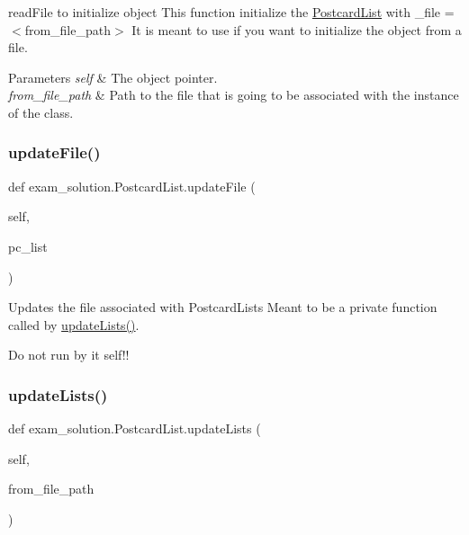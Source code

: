read\+File to initialize object This function initialize the \mbox{\hyperlink{classexam__solution_1_1PostcardList}{Postcard\+List}} with \+\_\+file = $<$from\+\_\+file\+\_\+path$>$ It is meant to use if you want to initialize the object from a file. 


\begin{DoxyParams}{Parameters}
{\em self} & The object pointer. \\
\hline
{\em from\+\_\+file\+\_\+path} & Path to the file that is going to be associated with the instance of the class. \\
\hline
\end{DoxyParams}
\mbox{\label{classexam__solution_1_1PostcardList_a766960e1e2aef673787fafb9e1ba41f4}} 
\subsubsection{\texorpdfstring{updateFile()}{updateFile()}}
{\footnotesize\ttfamily def exam\+\_\+solution.\+Postcard\+List.\+update\+File (\begin{DoxyParamCaption}\item[{}]{self,  }\item[{}]{pc\+\_\+list }\end{DoxyParamCaption})}



Updates the file associated with Postcard\+Lists Meant to be a private function called by \mbox{\hyperlink{classexam__solution_1_1PostcardList_aea8bf1e9f97027f792b4f0d7b6ca6e55}{update\+Lists()}}. 

Do not run by it self!! \mbox{\label{classexam__solution_1_1PostcardList_aea8bf1e9f97027f792b4f0d7b6ca6e55}} 
\subsubsection{\texorpdfstring{updateLists()}{updateLists()}}
{\footnotesize\ttfamily def exam\+\_\+solution.\+Postcard\+List.\+update\+Lists (\begin{DoxyParamCaption}\item[{}]{self,  }\item[{}]{from\+\_\+file\+\_\+path }\end{DoxyParamCaption})}



